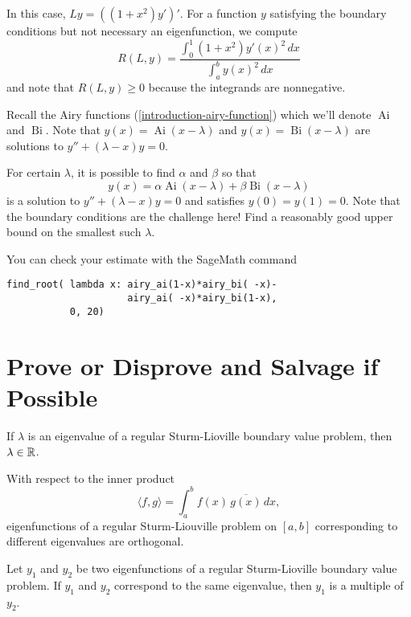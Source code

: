 \documentclass{homework}
\DeclareMathOperator{\Ai}{Ai}
\DeclareMathOperator{\Bi}{Bi}
\begin{document}
\begin{solution}
  In this case, $Ly = ((1+x^{2})y')'$.   For a function $y$ satisfying the boundary conditions but not necessary an eigenfunction, we compute
    \[
      R(L,y) =  \frac{\displaystyle\int _{0}^{1} (1+x^{2})y'(x)^{2} \,dx}
    {\displaystyle\int _{a}^{b}{y(x)^{2}}\,dx}
\]
and note that $R(L,y) \geq 0$ because the integrands are nonnegative.
\end{solution}

\begin{problem}
  Recall the Airy functions (\ref{introduction-airy-function}) which
  we'll denote $\Ai$ and $\Bi$.  Note that $y(x) = \Ai(x - \lambda)$
  and $y(x) = \Bi(x-\lambda)$ are solutions to
  $y'' + (\lambda - x) y = 0$.

  For certain $\lambda$, it is possible to find $\alpha$ and $\beta$ so that
  \[
    y(x) = \alpha \Ai(x - \lambda) + \beta \Bi(x - \lambda)
  \]
  is a solution to $y'' + (\lambda - x) y = 0$ and satisfies
  $y(0) = y(1) = 0$.  Note that the boundary conditions are the
  challenge here!  Find a reasonably good upper bound on the smallest
  such $\lambda$.

  You can check your estimate with the SageMath command
\begin{verbatim}
find_root( lambda x: airy_ai(1-x)*airy_bi( -x)-
                     airy_ai( -x)*airy_bi(1-x), 
           0, 20)
\end{verbatim}
\end{problem}


\section{Prove or Disprove and Salvage if Possible}

\begin{problem}
  If $\lambda$ is an eigenvalue of a regular Sturm-Lioville boundary
  value problem, then $\lambda \in \mathbb{R}$.
\end{problem}

\begin{problem}%
  With respect to the inner product
    \[
      \langle f, g \rangle = \displaystyle\int_a^b f(x) \, \overline{g(x)} \, dx,
    \]
    eigenfunctions of a regular Sturm-Liouville problem on $[a,b]$
    corresponding to different eigenvalues are orthogonal.
\end{problem}

\begin{problem}
  Let $y_1$ and $y_2$ be two eigenfunctions of a regular
  Sturm-Lioville boundary value problem.  If $y_1$ and $y_2$
  correspond to the same eigenvalue, then $y_1$ is a multiple of
  $y_2$.
\end{problem}
\end{document}
